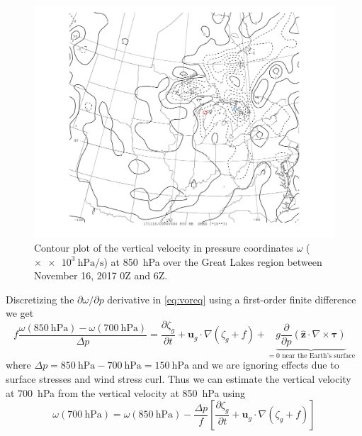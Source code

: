 \documentclass[11pt]{article}
\newcommand\p[2]{\frac{\partial #1}{\partial #2}}
\begin{document}
\begin{figure}[h!]
  \centering
  \includegraphics[width=\textwidth,trim={2.5cm 1cm 2.5cm 0},clip]{omega_MI_850hPa}
  \caption{Contour plot of the vertical velocity in pressure coordinates $\omega$ ($\times \SI{e3}{\hecto\Pa\per\s}$) at \SI{850}{\hecto\Pa} over the Great Lakes region between November 16, 2017 0Z and 6Z.}
  \label{fig:omega_MI_850hPa}
\end{figure}

Discretizing the $\partial \omega / \partial p$ derivative in \eqref{eq:voreq} using a first-order finite difference we get
\begin{equation*}
f \frac{\omega(\SI{850}{\hecto\Pa}) - \omega(\SI{700}{\hecto\Pa})}{\Delta p} = \p{\zeta_g}{t} + \bm{u}_g \cdot \nabla (\zeta_g + f) + \underbrace{g \p{}{p} (\hat{\bm{z}} \cdot \nabla \times \bm{\tau})}_\text{$=0$ near the Earth's surface}
\end{equation*}
where $\Delta p = \SI{850}{\hecto\Pa} - \SI{700}{\hecto\Pa} = \SI{150}{\hecto\Pa}$ and we are ignoring effects due to surface stresses and wind stress curl. Thus we can estimate the vertical velocity at \SI{700}{\hecto\Pa} from the vertical velocity at \SI{850}{\hecto\Pa} using
\begin{equation} \label{eq:voreq_fdiff}
\omega(\SI{700}{\hecto\Pa}) = \omega(\SI{850}{\hecto\Pa}) - \frac{\Delta p}{f} \left[ \p{\zeta_g}{t} + \bm{u}_g \cdot \nabla (\zeta_g + f) \right]
\end{equation}
\end{document}
